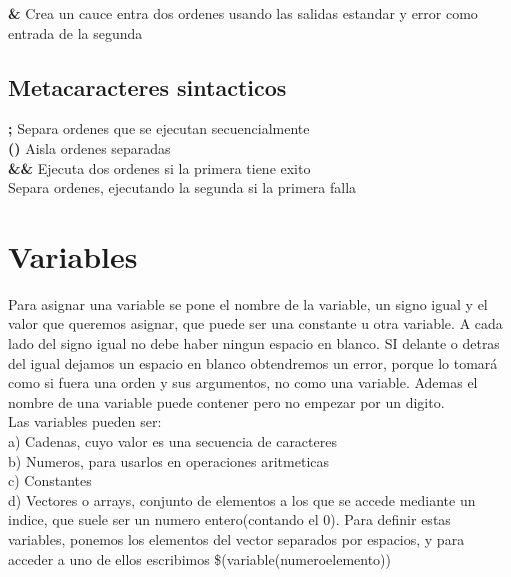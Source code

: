 \documentclass[11pt]{article}
\begin{document}
\textbf{\textbar \&} \hspace{2cm} Crea un cauce entra dos ordenes usando las salidas estandar y error como entrada de la segunda\\


\subsection { Metacaracteres sintacticos }

\textbf{;} \hspace{2cm} Separa ordenes que se ejecutan secuencialmente\\

\textbf{()} \hspace{2cm} Aisla ordenes separadas\\

\textbf{\&\&} \hspace{2cm} Ejecuta dos ordenes si la primera tiene exito \\

\textbf{\textbar\textbar} \hspace{2cm} Separa ordenes, ejecutando la segunda si la primera falla\\


\section {Variables}

Para asignar una variable se pone el nombre de la variable, un signo igual y el valor que queremos asignar, que puede ser una constante u otra variable. A cada lado del signo igual no debe haber ningun espacio en blanco. SI delante o detras del igual dejamos un espacio en blanco obtendremos un error, porque lo tomará como si fuera una orden y sus argumentos, no como una variable. Ademas el nombre de una variable puede contener pero no empezar por un digito. \\

Las variables pueden ser: \\
a) Cadenas, cuyo valor es una secuencia de caracteres\\
b) Numeros, para usarlos en operaciones aritmeticas\\
c) Constantes\\
d) Vectores o arrays, conjunto de elementos a los que se accede mediante un indice, que suele ser un numero entero(contando el 0). Para definir estas variables, ponemos los elementos del vector separados por espacios, y para acceder a uno de ellos escribimos \$(variable(numeroelemento))\\
\end{document}
